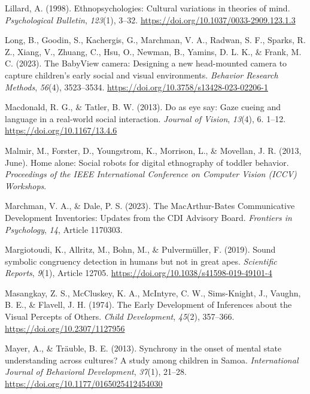 \documentclass[
]{scrbook}
\newlength{\cslhangindent}
\newenvironment{CSLReferences}[2] %
 {\begin{list}{}{%
  \setlength{\itemindent}{0pt}
  \setlength{\leftmargin}{0pt}
  \setlength{\parsep}{0pt}
  \ifodd #1
   \setlength{\leftmargin}{\cslhangindent}
   \setlength{\itemindent}{-1\cslhangindent}
  \fi
  \setlength{\itemsep}{#2\baselineskip}}}
 {\end{list}}
\begin{document}
\begin{CSLReferences}{1}{0}
Lillard, A. (1998). Ethnopsychologies: {Cultural} variations in theories of mind. \emph{Psychological Bulletin}, \emph{123}(1), 3--32. \url{https://doi.org/10.1037/0033-2909.123.1.3}

Long, B., Goodin, S., Kachergis, G., Marchman, V. A., Radwan, S. F., Sparks, R. Z., Xiang, V., Zhuang, C., Hsu, O., Newman, B., Yamins, D. L. K., \& Frank, M. C. (2023). The {BabyView} camera: {Designing} a new head-mounted camera to capture children's early social and visual environments. \emph{Behavior Research Methods}, \emph{56}(4), 3523--3534. \url{https://doi.org/10.3758/s13428-023-02206-1}

Macdonald, R. G., \& Tatler, B. W. (2013). Do as eye say: {Gaze} cueing and language in a real-world social interaction. \emph{Journal of Vision}, \emph{13}(4), 6. 1--12. \url{https://doi.org/10.1167/13.4.6}

Malmir, M., Forster, D., Youngstrom, K., Morrison, L., \& Movellan, J. R. (2013, June). Home alone: {Social} robots for digital ethnography of toddler behavior. \emph{Proceedings of the {IEEE} International Conference on Computer Vision ({ICCV}) Workshops}.

Marchman, V. A., \& Dale, P. S. (2023). The {MacArthur-Bates Communicative Development Inventories}: Updates from the {CDI Advisory Board}. \emph{Frontiers in Psychology}, \emph{14}, Article 1170303.

Margiotoudi, K., Allritz, M., Bohn, M., \& Pulvermüller, F. (2019). Sound symbolic congruency detection in humans but not in great apes. \emph{Scientific Reports}, \emph{9}(1), Article 12705. \url{https://doi.org/10.1038/s41598-019-49101-4}

Masangkay, Z. S., McCluskey, K. A., McIntyre, C. W., Sims-Knight, J., Vaughn, B. E., \& Flavell, J. H. (1974). The {Early Development} of {Inferences} about the {Visual Percepts} of {Others}. \emph{Child Development}, \emph{45}(2), 357--366. \url{https://doi.org/10.2307/1127956}

Mayer, A., \& Träuble, B. E. (2013). Synchrony in the onset of mental state understanding across cultures? {A} study among children in {Samoa}. \emph{International Journal of Behavioral Development}, \emph{37}(1), 21--28. \url{https://doi.org/10.1177/0165025412454030}


\end{CSLReferences}
\end{document}
